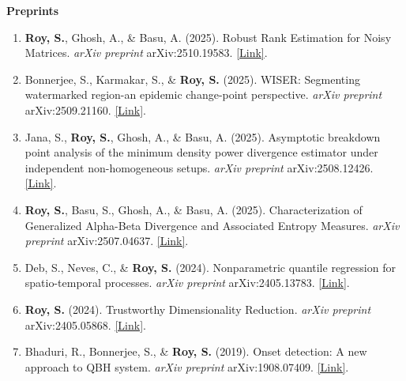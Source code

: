 \documentclass[11pt]{developercv} %
\begin{document}
\textbf{Preprints}
\begin{enumerate}
    \item \textbf{Roy, S.}, Ghosh, A., \& Basu, A. (2025). Robust Rank Estimation for Noisy Matrices. \emph{arXiv preprint} arXiv:2510.19583. \href{https://arxiv.org/abs/2510.19583}{[Link]}.
    \item Bonnerjee, S., Karmakar, S., \& \textbf{Roy, S.} (2025). WISER: Segmenting watermarked region-an epidemic change-point perspective. \emph{arXiv preprint} arXiv:2509.21160. \href{https://arxiv.org/abs/2509.21160}{[Link]}.
    \item Jana, S., \textbf{Roy, S.}, Ghosh, A., \& Basu, A. (2025). Asymptotic breakdown point analysis of the minimum density power divergence estimator under independent non-homogeneous setups. \emph{arXiv preprint} arXiv:2508.12426. \href{https://arxiv.org/abs/2508.12426}{[Link]}.
    \item \textbf{Roy, S.}, Basu, S., Ghosh, A., \& Basu, A. (2025). Characterization of Generalized Alpha-Beta Divergence and Associated Entropy Measures. \emph{arXiv preprint} arXiv:2507.04637. \href{https://arxiv.org/abs/2507.04637}{[Link]}.
    \item Deb, S., Neves, C., \& \textbf{Roy, S.} (2024). Nonparametric quantile regression for spatio-temporal processes. \emph{arXiv preprint} arXiv:2405.13783. \href{https://arxiv.org/abs/2405.13783}{[Link]}.
    \item \textbf{Roy, S.} (2024). Trustworthy Dimensionality Reduction. \emph{arXiv preprint} arXiv:2405.05868. \href{https://arxiv.org/abs/2405.05868}{[Link]}.
    \item Bhaduri, R., Bonnerjee, S., \& \textbf{Roy, S.} (2019). Onset detection: A new approach to QBH system. \emph{arXiv preprint} arXiv:1908.07409. \href{https://arxiv.org/abs/1908.07409}{[Link]}.
\end{enumerate}

\end{document}
